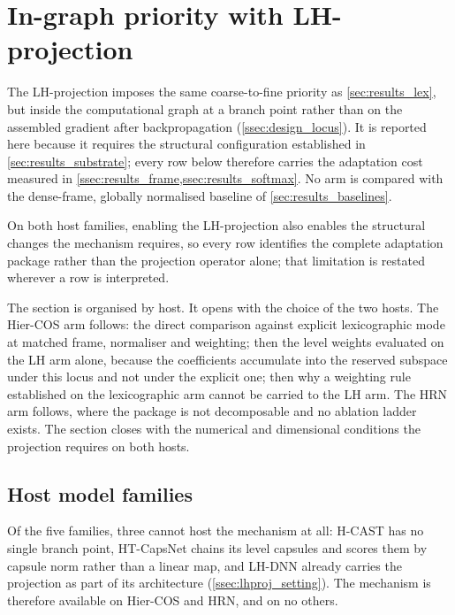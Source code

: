 \section{In-graph priority with LH-projection}
\label{sec:results_lhprojection}

The LH-projection imposes the same coarse-to-fine priority as
\cref{sec:results_lex}, but inside the computational graph at a branch point
rather than on the assembled gradient after backpropagation
(\cref{ssec:design_locus}). It is reported here because it requires the
structural configuration established in \cref{sec:results_substrate}; every row
below
therefore carries the adaptation cost measured in
\cref{ssec:results_frame,ssec:results_softmax}. No arm is compared with the
dense-frame, globally normalised baseline of \cref{sec:results_baselines}.

On both host families, enabling the LH-projection also enables the structural
changes the mechanism requires, so every row identifies the complete adaptation
package rather than the projection operator alone; that limitation is restated
wherever a row is interpreted.

The section is organised by host. It opens with the choice of the two hosts. The
Hier-COS arm follows: the direct comparison against explicit lexicographic mode
at matched frame, normaliser and weighting; then the level weights evaluated on
the LH arm alone, because the coefficients accumulate into the reserved subspace
under this locus and not under the explicit one; then why a weighting rule
established on the lexicographic arm cannot be carried to the LH arm. The HRN arm follows, where the package is not
decomposable and no ablation ladder exists. The section closes with the
numerical and dimensional conditions the projection requires on both hosts.

\subsection{Host model families}
\label{ssec:results_lhproj_hosts}

Of the five families, three cannot host the mechanism at all: H-CAST has no
single branch point, HT-CapsNet chains its level capsules and scores them by
capsule norm rather than a linear map, and LH-DNN already carries the projection
as part of its architecture (\cref{ssec:lhproj_setting}). The mechanism is
therefore available on Hier-COS and HRN, and on no others.

